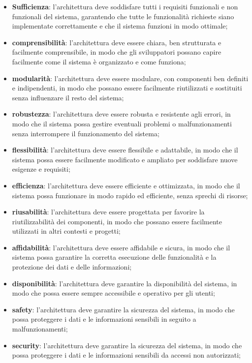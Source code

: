 \begin{itemize}
	\item \textbf{Sufficienza}: l'architettura deve soddisfare tutti i requisiti funzionali e non funzionali del sistema, garantendo che tutte le funzionalità richieste siano implementate correttamente e che il sistema funzioni in modo ottimale;
	\item \textbf{comprensibilità}: l'architettura deve essere chiara, ben strutturata e facilmente comprensibile, in modo che gli sviluppatori possano capire facilmente come il sistema è organizzato e come funziona;
	\item \textbf{modularità}: l'architettura deve essere modulare, con componenti ben definiti e indipendenti, in modo che possano essere facilmente riutilizzati e sostituiti senza influenzare il resto del sistema;
	\item \textbf{robustezza}: l'architettura deve essere robusta e resistente agli errori, in modo che il sistema possa gestire eventuali problemi o malfunzionamenti senza interrompere il funzionamento del sistema;
	\item \textbf{flessibilità}: l'architettura deve essere flessibile e adattabile, in modo che il sistema possa essere facilmente modificato e ampliato per soddisfare nuove esigenze e requisiti;
	\item \textbf{efficienza}: l'architettura deve essere efficiente e ottimizzata, in modo che il sistema possa funzionare in modo rapido ed efficiente, senza sprechi di risorse;
	\item \textbf{riusabilità}: l'architettura deve essere progettata per favorire la riutilizzabilità dei componenti, in modo che possano essere facilmente utilizzati in altri contesti e progetti;
	\item \textbf{affidabilità}: l'architettura deve essere affidabile e sicura, in modo che il sistema possa garantire la corretta esecuzione delle funzionalità e la protezione dei dati e delle informazioni;
	\item \textbf{disponibilità}: l'architettura deve garantire la disponibilità del sistema, in modo che possa essere sempre accessibile e operativo per gli utenti;
	\item \textbf{safety}: l'architettura deve garantire la sicurezza del sistema, in modo che possa proteggere i dati e le informazioni sensibili in seguito a malfunzionamenti;
	\item \textbf{security}: l'architettura deve garantire la sicurezza del sistema, in modo che possa proteggere i dati e le informazioni sensibili da accessi non autorizzati;

\end{itemize}
